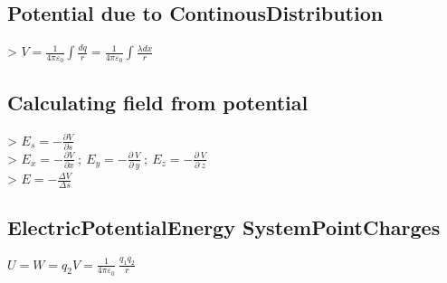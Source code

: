 \subsection{Potential due to ContinousDistribution}
> $V=\frac{1}{4\pi \varepsilon _0}\int \frac{dq}{r}=\frac{1}{4\pi \varepsilon _0}\int \frac{\lambda dx}{r}$\\
\subsection{Calculating field from potential}
> $E_s=-\frac{\partial V}{\partial s}$\\
> $E_x=-\frac{\partial V}{\partial x}\:;\:E_y=-\frac{\partial \:V}{\partial \:y}\:;\:E_z=-\frac{\partial \:V}{\partial \:z}$\\
> $E=-\frac{\Delta V}{\Delta s}$\\
\subsection{ElectricPotentialEnergy SystemPointCharges}
$U=W=q_2V=\frac{1}{4\pi \varepsilon _0}\:\frac{q_1q_2}{r}$\\
